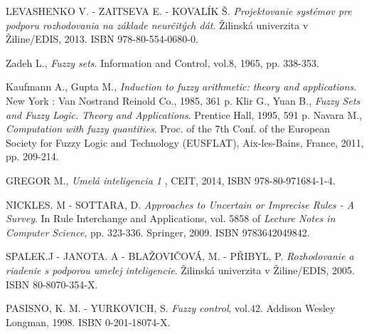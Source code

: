 \begin{thebibliography}{}                               
	 \label{literatura}


 LEVASHENKO V. - ZAITSEVA E. - KOVALÍK Š. {\it Projektovanie systémov pre podporu rozhodovania na základe neurčitých dát}. Žilinská univerzita v Žiline/EDIS, 2013. ISBN 978-80-554-0680-0.


 Zadeh L., {\it Fuzzy sets}. Information and Control, vol.8, 1965, pp. 338-353. 

 Kaufmann A., Gupta M., {\it Induction to fuzzy arithmetic: theory and applications}. New York : Van Nostrand Reinold Co., 1985, 361 p. 
Klir G., Yuan B., {\it Fuzzy Sets and Fuzzy Logic. Theory and Applications}. Prentice Hall, 1995, 591 p. 
Navara M., {\it Computation with fuzzy quantities}. Proc. of the 7th Conf. of the European Society for Fuzzy Logic and Technology (EUSFLAT), Aix-les-Bains, France, 2011, pp. 209-214.






 GREGOR M., {\it Umelá inteligencia 1} , CEIT, 2014, ISBN 978-80-971684-1-4.

 NICKLES. M - SOTTARA, D. {\it Approaches to Uncertain or Imprecise Rules - A Survey}. In Rule Interchange and Applications, vol. 5858 of {\it Lecture Notes in Computer Science}, pp. 323-336. Springer, 2009. ISBN 9783642049842. 

 SPALEK.J - JANOTA. A - BLAŽOVIČOVÁ, M. - PŘIBYL, P. {\it Rozhodovanie a riadenie s podporou umelej inteligencie}. Žilinská univerzita v Žiline/EDIS, 2005. ISBN 80-8070-354-X. 

PASISNO, K. M. - YURKOVICH, S. {\it Fuzzy control}, vol.42. Addison Wesley Longman, 1998. ISBN 0-201-18074-X.  

        
\end{thebibliography}


